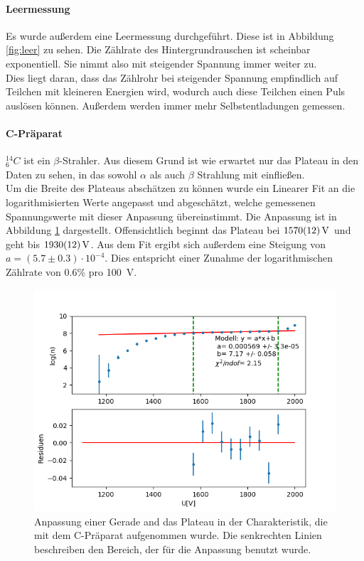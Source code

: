 \documentclass[12pt,a4paper]{article}
\begin{document}
\paragraph{Leermessung}
Es wurde außerdem eine Leermessung durchgeführt. Diese ist in Abbildung \ref{fig:leer} zu sehen. Die Zählrate des Hintergrundrauschen ist scheinbar exponentiell. Sie nimmt also mit steigender Spannung immer weiter zu.\\
Dies liegt daran, dass das Zählrohr bei steigender Spannung empfindlich auf Teilchen mit kleineren Energien wird, wodurch auch diese Teilchen einen Puls auslösen können. Außerdem werden immer mehr Selbstentladungen gemessen.

\paragraph{C-Präparat}
$_6^{14} C$ ist ein $\beta$-Strahler. Aus diesem Grund ist wie erwartet nur das Plateau in den Daten zu sehen, in das sowohl $\alpha$ als auch $\beta$ Strahlung mit einfließen.\\
Um die Breite des Plateaus abschätzen zu können wurde ein Linearer Fit an die logarithmisierten Werte angepasst und abgeschätzt, welche gemessenen Spannungswerte  mit dieser Anpassung übereinstimmt. Die Anpassung ist in Abbildung \ref{fig:CPlateau} dargestellt. Offensichtlich beginnt das Plateau bei $\SI{1570\pm 12}{V}$ und geht bis $\SI{1930\pm 12}{V}$. Aus dem Fit ergibt sich außerdem eine Steigung von $a = (5.7\pm0.3)\cdot 10^{-4}$. Dies entspricht einer Zunahme der logarithmischen Zählrate von 0.6\% pro \SI{100}{V}.
\begin{figure}
\centering
\includegraphics[scale=0.8]{Bilder/Prop/C_plateau.PNG}
\caption{Anpassung einer Gerade and das Plateau in der Charakteristik, die mit dem C-Präparat aufgenommen wurde. Die senkrechten Linien beschreiben den Bereich, der für die Anpassung benutzt wurde.}
\label{fig:CPlateau}
\end{figure}\\
\end{document}
